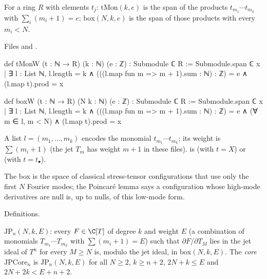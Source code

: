 \begin{definition}\label{l29:def:box}
For a ring $R$ with elements $t_j$: $\mathrm{tMon}(k,e)$ is the span of the products $t_{m_1}\cdots t_{m_k}$ with
$\sum_i(m_i+1)=e$; $\mathrm{box}(N,k,e)$ is the span of those products with every $m_i<N$.
\end{definition}

\noindent Files  and
.
\begin{leancode}
def tMonW (t : ℕ → R) (k : ℕ) (e : ℤ) : Submodule ℂ R :=
  Submodule.span ℂ
    {x | ∃ l : List ℕ, l.length = k ∧ (((l.map fun m => m + 1).sum : ℕ) : ℤ) = e ∧
      (l.map t).prod = x}

def boxW (t : ℕ → R) (N k : ℕ) (e : ℤ) : Submodule ℂ R :=
  Submodule.span ℂ {x | ∃ l : List ℕ, l.length = k ∧ (((l.map fun m => m + 1).sum : ℕ) : ℤ) = e ∧
    (∀ m ∈ l, m < N) ∧ (l.map t).prod = x}
\end{leancode}

\begin{dictionary}
A list $l=(m_1,\dots,m_k)$ encodes the monomial $t_{m_1}\cdots t_{m_k}$; its weight is $\sum(m_i+1)$ (the jet $T_m$ has
weight $m+1$ in these files).  is  (with $t=X$) or  (with $t=t_\bullet$).
\end{dictionary}

\begin{physics}
The box is the space of classical stress-tensor configurations that use only the first $N$ Fourier modes; the Poincar\'e
lemma says a configuration whose high-mode derivatives are null is, up to nulls, of this low-mode form.
\end{physics}

\begin{status}
Definitions.
\end{status}

\begin{definition}\label{l29:def:poincare}
$\mathrm{JP}_n(N,k,E)$: every $F\in\C[T]$ of degree $k$ and weight $E$ (a combination of monomials
$T_{m_1}\cdots T_{m_k}$ with $\sum(m_i+1)=E$) such that $\partial F/\partial T_M$ lies in the jet ideal of $T^n$ for every
$M\ge N$ is, modulo the jet ideal, in $\mathrm{box}(N,k,E)$. The \emph{core} $\mathrm{JPCore}_n$ is $\mathrm{JP}_n(N,k,E)$
for all $N\ge2$, $k\ge n+2$, $2N+k\le E$ and $2N+2k<E+n+2$.
\end{definition}

